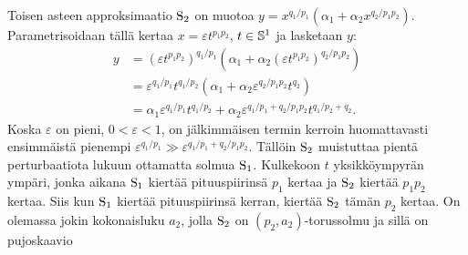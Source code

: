 \begin{esimerkki}
    \label{esim:2-aste-puiseux-solmu}
    Toisen asteen approksimaatio $\solmu_2$ on muotoa $y=x^{q_1/p_1}(\alpha_1+\alpha_2x^{q_2/p_1p_2})$.
    Parametrisoidaan tällä kertaa $x=\varepsilon t^{p_1p_2}$, $t\in\S^1$ ja lasketaan $y$:
    \begin{align*}
        y&=(\varepsilon t^{p_1p_2})^{q_1/p_1}(\alpha_1+\alpha_2(\varepsilon t^{p_1p_2})^{q_2/p_1p_2}) \\
        &=\varepsilon^{q_1/p_1}t^{q_1/p_2}(\alpha_1+\alpha_2\varepsilon^{q_2/p_1p_2}t^{q_2}) \\
        &=\alpha_1\varepsilon^{q_1/p_1}t^{q_1/p_2}+\alpha_2\varepsilon^{q_1/p_1+q_2/p_1p_2}t^{q_1/p_2+q_2}.
    \end{align*}
    Koska $\varepsilon$ on pieni, $0<\varepsilon<1$, on jälkimmäisen termin kerroin huomattavasti ensimmäistä pienempi $\varepsilon^{q_1/p_1}\gg\varepsilon^{q_1/p_1+q_2/p_1p_2}$. Tällöin $\solmu_2$ muistuttaa pientä perturbaatiota lukuun ottamatta solmua $\solmu_1$. Kulkekoon $t$ yksikköympyrän ympäri, jonka aikana $\solmu_1$ kiertää pituuspiirinsä $p_1$ kertaa ja $\solmu_2$ kiertää $p_1p_2$ kertaa. Siis kun $\solmu_1$ kiertää pituuspiirinsä kerran, kiertää $\solmu_2$ tämän $p_2$ kertaa. On olemassa jokin kokonaisluku $a_2$, jolla $\solmu_2$ on $(p_2,a_2)$-torussolmu ja sillä on pujoskaavio
    \begin{center}
    \end{center}
\end{esimerkki}
